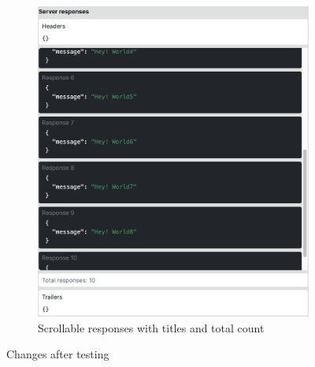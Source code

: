 \begin{figure}[!htb]
\begin{subfigure}{.55\textwidth}
        \includegraphics[width=.95\linewidth]{images/testing/screenshots/testing-responses}
        \caption{Scrollable responses with titles and total count}
        \label{fig:testing-changes-responses}
    \end{subfigure}%

    \caption{Changes after testing}
    \label{fig:testing-screenshots}
\end{figure}